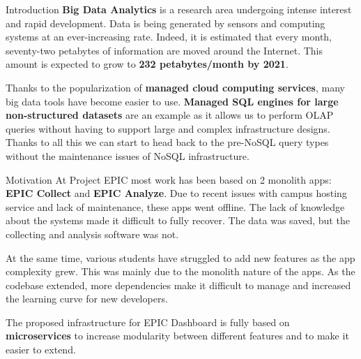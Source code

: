 \documentclass[final]{beamer}
\newlength{\onecolwid}
\begin{document}
\begin{darkframes}
\begin{frame}
\begin{columns}[t]
\begin{column}{\onecolwid}


\begin{exampleblock}{Introduction}
\textbf{Big Data Analytics} is a research area undergoing intense interest and rapid development. Data is being generated by sensors and computing systems at an ever-increasing rate. Indeed, it is estimated that every month, seventy-two petabytes of
information are moved around the Internet. This amount is expected to grow
to \textbf{232 petabytes/month by 2021}. 

Thanks to the popularization of \textbf{managed cloud computing services}, many big data tools have become easier to use. \textbf{Managed SQL engines for large non-structured datasets} are an example as it allows us to perform OLAP queries without having to support large and complex infrastructure designs. Thanks to all this we can start to head back to the pre-NoSQL query types without the maintenance issues of NoSQL infrastructure.
\end{exampleblock}
\begin{exampleblock}{Motivation}
At Project EPIC most work has been based on 2 monolith apps: \textbf{EPIC Collect}\cite{schram2012mysql} and \textbf{EPIC Analyze}\cite{anderson2015design}. Due to recent issues with campus hosting service and lack of maintenance, these apps went offline. The lack of knowledge about the systems made it difficult to fully recover. The data was saved, but the collecting and analysis software was not.

At the same time, various students have struggled to add new features as the app complexity grew. This was mainly due to the monolith nature of the apps. As the codebase extended, more dependencies make it difficult to manage and increased the learning curve for new developers.

The proposed infrastructure for EPIC Dashboard is fully based on \textbf{microservices} to increase modularity between different features and to make it easier to extend. 
\end{exampleblock}





\end{column}
\end{columns}
\end{frame}
\end{darkframes}
\end{document}
